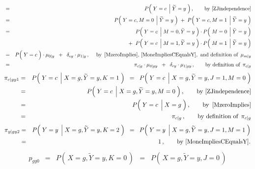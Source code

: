 \begin{enumerate}
\begin{eqnarray*}
\\
&=&
	P\!\left(\;Y=c\;\left\vert\;\widetilde{Y}=y\right.\,\right),
	\quad\quad
	\textnormal{by \eqref{ZJindependence}}
\\
&=&
	P\!\left(\;Y=c,M=0\;\left\vert\;\widetilde{Y}=y\right.\,\right)
	\;+\;
	P\!\left(\;Y=c,M=1\;\left\vert\;\widetilde{Y}=y\right.\,\right)
\\
&=&
	{\color{white}+}\;\;
	P\!\left(\;Y=c\;\left\vert\;M=0,\widetilde{Y}=y\right.\,\right)
	\cdot
	P\!\left(\;M=0\;\left\vert\;\widetilde{Y}=y\right.\,\right)
\\
&&
	+\;\;
	P\!\left(\;Y=c\;\left\vert\;M=1,\widetilde{Y}=y\right.\,\right)
	\cdot
	P\!\left(\;M=1\;\left\vert\;\widetilde{Y}=y\right.\,\right)
\\
&=&
	P\!\left(\;Y\overset{{\color{white}-}}{=}c\;\right)
	\cdot
	\mu_{0 \vert y}
	\;\;+\;\;
	\delta_{cy}
	\cdot
	\mu_{1 \vert y}\,,
	\quad\;
	\textnormal{by \,\eqref{MzeroImplies}, \eqref{MoneImpliesCEqualsY},\, and definition of \,$\mu_{m \vert y}$}
\\
&=&
	\pi_{c \vert g}
	\cdot
	\mu_{0 \vert gy}
	\;\;+\;\;
	\delta_{cy}
	\cdot
	\mu_{1 \vert gy}\,,
	\quad\quad
	\textnormal{by definition of \,$\pi_{c \vert g}$}
\end{eqnarray*}
\begin{eqnarray*}
\pi_{c \vert gy1}
&=&
	P\!\left(\;Y=c\;\left\vert\;X=g,\widetilde{Y}=y,K=1\right.\,\right)
\;\;=\;\;
	P\!\left(\;Y=c\;\left\vert\;X=g,\widetilde{Y}=y,J=1,M=0\right.\,\right)
\\
&=&
	P\!\left(\;Y=c\;\left\vert\;X=g,\widetilde{Y}=y,M=0\right.\,\right),
	\quad\quad
	\textnormal{by \eqref{ZJindependence}}
\\
&=&
	P\!\left(\;Y=c\;\left\vert\;X\overset{{\color{white}-}}{=}g\right.\,\right),
	\quad\quad
	\textnormal{by \,\eqref{MzeroImplies}}
\\
&=&
	\pi_{c \vert g}\,,
	\quad\quad
	\textnormal{by definition of \,$\pi_{c \vert g}$}
\end{eqnarray*}
\begin{eqnarray*}
\pi_{y \vert gy2}
&=&
	P\!\left(\;Y=y\;\left\vert\;X=g,\widetilde{Y}=y,K=2\right.\,\right)
\;\;=\;\;
	P\!\left(\;Y=y\;\left\vert\;X=g,\widetilde{Y}=y,J=1,M=1\right.\,\right)
\\
&=&
	1\,,
	\quad\quad
	\textnormal{by \eqref{MoneImpliesCEqualsY}.}
\end{eqnarray*}
\begin{eqnarray*}
p_{gy0}
&=&
	P\!\left(\,X=g,\widetilde{Y}=y,K=0\,\right)
\;\;=\;\;
	P\!\left(\,X=g,\widetilde{Y}=y,J=0\,\right)

\end{eqnarray*}
\end{enumerate}
